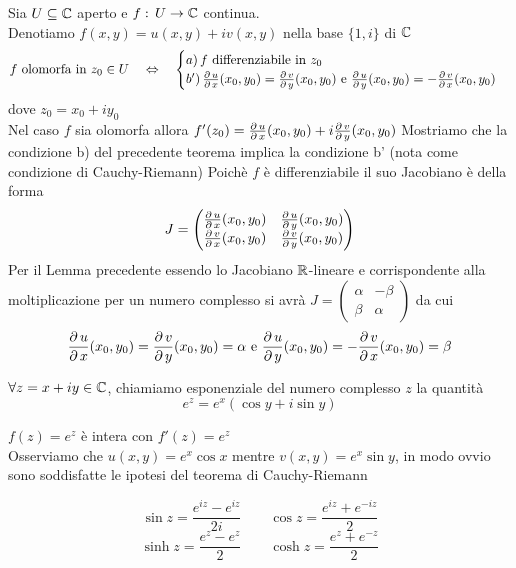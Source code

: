 \begin{thm}\bianco
Sia $U\subseteq \mathbb{C}$ aperto e $f:\, U\to \mathbb{C}$ continua.\\
Denotiamo $f(x,y)=u(x,y)+iv(x,y)$ nella base $\{1 , i\}$ di $\mathbb{C}$
$$ f \text{ olomorfa in } z_0\in U \quad \Leftrightarrow \quad \begin{cases} a)\, f \text{ differenziabile in } z_0\\ 
b')\, \frac{\partial \, u}{\partial\, x} (x_0,y_0) = \frac{\partial \, v}{\partial\, y} (x_0, y_0)  \text{ e } \frac{\partial \, u}{\partial\, y} (x_0,y_0) = -\frac{\partial \, v}{\partial\, x} (x_0,y_0)\end{cases}$$
dove $z_0=x_0+iy_0$\\
Nel caso $f$ sia olomorfa allora $f'(z_0)=\frac{\partial \, u}{\partial\, x} (x_0,y_0) + i \frac{\partial \, v}{\partial\, y} (x_0,y_0)$
\proof Mostriamo che la condizione b) del precedente teorema implica la condizione b' (nota come condizione di Cauchy-Riemann)
Poich\`e $f$ \`e differenziabile il suo Jacobiano \`e della forma
$$J=\begin{pmatrix}
\frac{\partial \, u}{\partial\, x} (x_0,y_0) & \frac{\partial \, u}{\partial\, y} (x_0, y_0)\\
\frac{\partial \, v}{\partial\, x} (x_0, y_0) & \frac{\partial \, v}{\partial\, y} (x_0, y_0)
\end{pmatrix} $$
Per il Lemma precedente essendo lo Jacobiano $\mathbb{R}$-lineare e corrispondente alla moltiplicazione per un numero complesso si avr\`a 
$J=\begin{pmatrix}
 \alpha & -\beta \\ \beta & \alpha
\end{pmatrix}$ da cui
$$ \frac{\partial \, u}{\partial\, x} (x_0,y_0) = \frac{\partial \, v}{\partial\, y} (x_0, y_0) = \alpha \text{ e } \frac{\partial \, u}{\partial\, y} (x_0, y_0) = - \frac{\partial \, v}{\partial\, x} (x_0, y_0) =\beta $$
\endproof
\end{thm}
\begin{defn}$\forall z=x + i y \in \mathbb{C}$, chiamiamo esponenziale del numero complesso $z$ la quantit\`a 
$$e^z=e^x(\cos y + i \sin y)$$
\end{defn}
\begin{ese}$f(z)=e^z$ \`e intera con $f'(z) = e^z$\\
Osserviamo che $u(x,y)= e^x \cos x $ mentre $v(x,y) = e^x \sin y$, in modo ovvio sono soddisfatte le ipotesi del teorema di Cauchy-Riemann
\end{ese}

\begin{defn}
$$\sin z = \frac{e^{iz}-e^{iz}}{2i} \qquad \cos z= \frac{e^{iz}+e^{-iz}}{2}$$
$$\sinh z = \frac{e^{z}-e^{z}}{2} \qquad \cosh z= \frac{e^{z}+e^{-z}}{2}$$
\end{defn}













